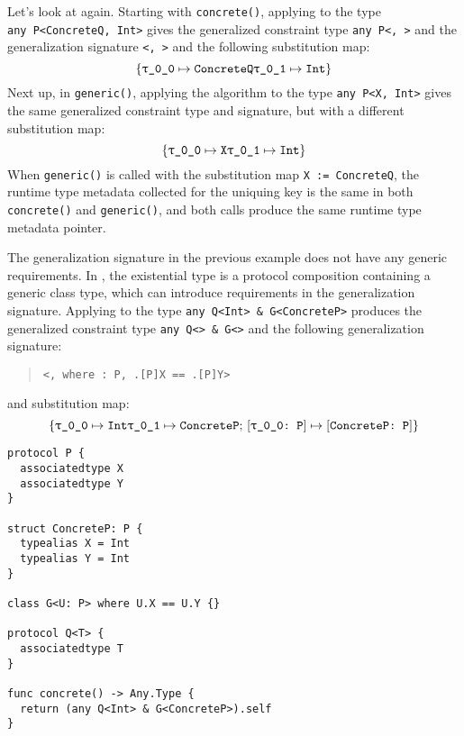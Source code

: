 \documentclass[../generics]{subfiles}
\begin{document}
\begin{example} Let's look at  again. Starting with \texttt{concrete()}, applying  to the type \texttt{any~P<ConcreteQ,~Int>} gives the generalized constraint type \texttt{any~P<,~>} and the generalization signature \texttt{<, >} and the following substitution map:
\[
\{
\texttt{\texttt{$\uptau$\_0\_0}} \mapsto \texttt{ConcreteQ}\\
\texttt{\texttt{$\uptau$\_0\_1}} \mapsto \texttt{Int}
\}
\]
Next up, in \texttt{generic()}, applying the algorithm to the type \texttt{any~P<X,~Int>} gives the same generalized constraint type and signature, but with a different substitution map:
\[
\{
\texttt{\texttt{$\uptau$\_0\_0}} \mapsto \texttt{X}\\
\texttt{\texttt{$\uptau$\_0\_1}} \mapsto \texttt{Int}
\}
\]
When \texttt{generic()} is called with the substitution map \texttt{X := ConcreteQ}, the runtime type metadata collected for the uniquing key is the same in both \texttt{concrete()} and \texttt{generic()}, and both calls produce the same runtime type metadata pointer.
\end{example}

\begin{example}
The generalization signature in the previous example does not have any generic requirements. In , the existential type is a protocol composition containing a generic class type, which can introduce requirements in the generalization signature. Applying  to the type \texttt{any~Q<Int>~\&~G<ConcreteP>} produces the generalized constraint type \texttt{any~Q<>~\&~G<>} and the following generalization signature:
\begin{quote}
\texttt{<,  where :\ P, .[P]X == .[P]Y>}
\end{quote}
and substitution map:
\[
\{
\texttt{\texttt{$\uptau$\_0\_0}} \mapsto \texttt{Int}\\
\texttt{\texttt{$\uptau$\_0\_1}} \mapsto \texttt{ConcreteP}
;\,
[\texttt{\texttt{$\uptau$\_0\_0}:~P}] \mapsto [\texttt{ConcreteP:~P}]
\}
\]
\end{example}
\begin{listing}\label{generalizationrequirements}
\begin{Verbatim}
protocol P {
  associatedtype X
  associatedtype Y
}

struct ConcreteP: P {
  typealias X = Int
  typealias Y = Int
}

class G<U: P> where U.X == U.Y {}

protocol Q<T> {
  associatedtype T
}

func concrete() -> Any.Type {
  return (any Q<Int> & G<ConcreteP>).self
}
\end{Verbatim}
\end{listing}
\end{document}
